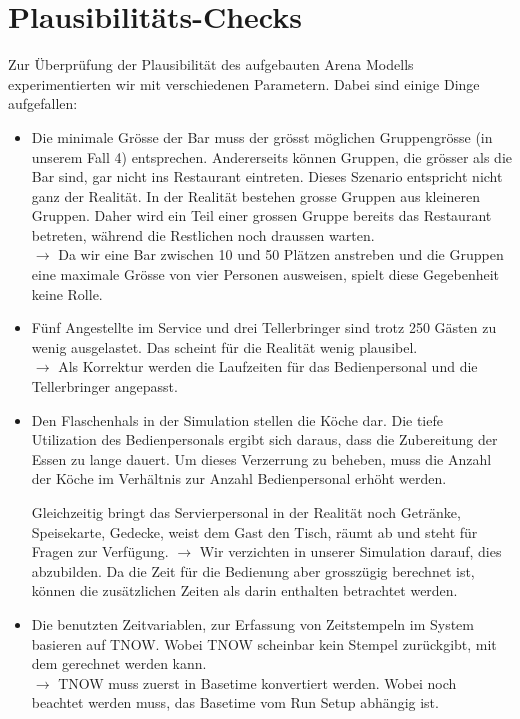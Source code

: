 \documentclass[ngerman,a4paper,12pt]{scrreprt}
\begin{document}
	\section{Plausibilitäts-Checks}
	Zur Überprüfung der Plausibilität des aufgebauten Arena Modells experimentierten wir mit verschiedenen Parametern. Dabei sind einige Dinge aufgefallen:
	\begin{itemize}
		\item Die minimale Grösse der Bar muss der grösst möglichen Gruppengrösse (in unserem Fall 4) entsprechen. Andererseits können Gruppen, die grösser als die Bar sind, gar nicht ins Restaurant eintreten.
		Dieses Szenario entspricht nicht ganz der Realität. In der Realität bestehen grosse Gruppen aus kleineren Gruppen. Daher wird ein Teil einer grossen Gruppe bereits das Restaurant betreten, während die Restlichen noch draussen warten.\\
		$\rightarrow$ Da wir eine Bar zwischen 10 und 50 Plätzen anstreben und die Gruppen eine maximale Grösse von vier Personen ausweisen, spielt diese Gegebenheit keine Rolle.
		\item Fünf Angestellte im Service und drei Tellerbringer sind trotz 250 Gästen zu wenig ausgelastet. Das scheint für die Realität wenig plausibel.\\
		$\rightarrow$ Als Korrektur werden die Laufzeiten für das Bedienpersonal und die Tellerbringer angepasst.
		\item Den Flaschenhals in der Simulation stellen die Köche dar. Die tiefe Utilization des Bedienpersonals ergibt sich daraus, dass die Zubereitung der Essen zu lange dauert. Um dieses Verzerrung zu beheben, muss die Anzahl der Köche im Verhältnis zur Anzahl Bedienpersonal erhöht werden.
		
		Gleichzeitig bringt das Servierpersonal in der Realität noch Getränke, Speisekarte, Gedecke, weist dem Gast den Tisch, räumt ab und steht für Fragen zur Verfügung.
		$\rightarrow$ Wir verzichten in unserer Simulation darauf, dies abzubilden. Da die Zeit für die Bedienung aber grosszügig berechnet ist, können die zusätzlichen Zeiten als darin enthalten betrachtet werden.
		\item Die benutzten Zeitvariablen, zur Erfassung von Zeitstempeln im System basieren auf TNOW. Wobei TNOW scheinbar kein Stempel zurückgibt, mit dem gerechnet werden kann.\\
		$\rightarrow$ TNOW muss zuerst in Basetime konvertiert werden. Wobei noch beachtet werden muss, das Basetime vom Run Setup abhängig ist.
	\end{itemize}
			
\end{document}
